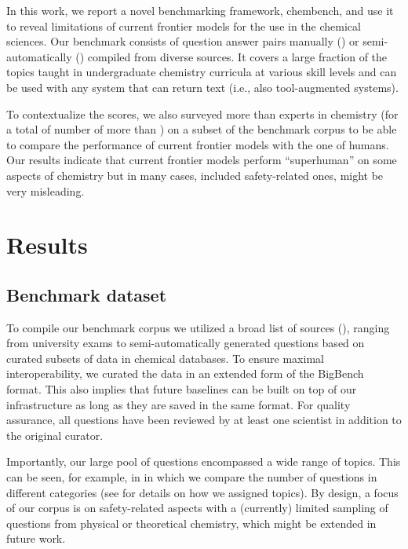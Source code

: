 \documentclass[11pt, oneside]{article}
\begin{document}
In this work, we report a novel benchmarking framework, chembench, and use it to reveal limitations of current frontier models for the use in the chemical sciences.
Our benchmark consists of \unskip question answer pairs manually (\unskip) or semi-automatically (\unskip) compiled from diverse sources. 
It covers a large fraction of the topics taught in undergraduate chemistry curricula at various skill levels and can be used with any system that can return text (i.e., also tool-augmented systems).

To contextualize the scores, we also surveyed more than  experts in chemistry (for a total of number of more than \unskip) on a subset of the benchmark corpus to be able to compare the performance of current frontier models with the one of humans.
Our results indicate that current frontier models perform \enquote{superhuman} on some aspects of chemistry but in many cases, included safety-related ones, might be very misleading. 


\section{Results}

\subsection{Benchmark dataset}

To compile our benchmark corpus we utilized a broad list of sources (), ranging from university exams to semi-automatically generated questions based on curated subsets of data in chemical databases. 
To ensure maximal interoperability, we curated the data in an extended form of the BigBench format. 
This also implies that future baselines can be built on top of our infrastructure as long as they are saved in the same format. 
For quality assurance, all questions have been reviewed by at least one scientist in addition to the original curator.

Importantly, our large pool of questions encompassed a wide range of topics. 
This can be seen, for example, in  in which we compare the number of questions in different categories (see  for details on how we assigned topics). 
By design, a focus of our corpus is on safety-related aspects with a (currently) limited sampling of questions from physical or theoretical chemistry, which might be extended in future work.
\end{document}

